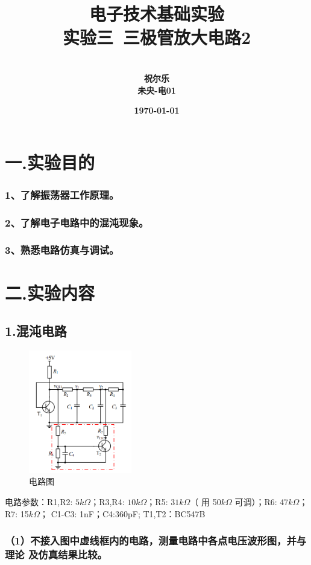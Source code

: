 \documentclass[UTF8]{ctexart}
\title{{电子技术基础实验} \\ \textbf{实验三\ 三极管放大电路2}}
\author{\\\textbf{祝尔乐}
        \\\textbf{未央-电01}
        }
\date{\textbf{\today}}
\begin{document}
\maketitle

\section*{一.实验目的}
\subsubsection*{
1、了解振荡器工作原理。}
\subsubsection*{
2、了解电子电路中的混沌现象。}
\subsubsection*{
3、熟悉电路仿真与调试。}



\section*{二.实验内容}

\subsection*{1.混沌电路}

\begin{figure}[htbp]
    \centering
    \includegraphics[width=0.40\textwidth]{1-电路图.png}
    \caption{电路图}
\end{figure}
电路参数：R1,R2: $5k \Omega$；R3,R4: $10k \Omega$；R5: $31k \Omega$（
用 50$k \Omega$ 可调）；R6: 47$k \Omega$；R7: 15$k \Omega$；
C1-C3: 1nF；C4:360pF;
T1,T2：BC547B

\subsubsection*{（1）不接入图中虚线框内的电路，测量电路中各点电压波形图，并与理论
及仿真结果比较。}
\end{document}
